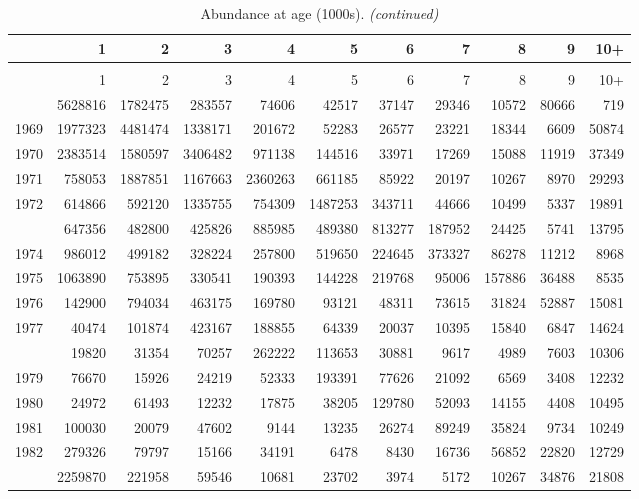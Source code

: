 \documentclass[
]{article}
\begin{document}
\begin{longtable}[t]{lrrrrrrrrrr}
\caption{\label{tab:NAA-table}Abundance at age (1000s).}\\
\toprule
  & 1 & 2 & 3 & 4 & 5 & 6 & 7 & 8 & 9 & 10+\\
\midrule
\endfirsthead
\caption[]{Abundance at age (1000s). \textit{(continued)}}\\
\toprule
  & 1 & 2 & 3 & 4 & 5 & 6 & 7 & 8 & 9 & 10+\\
\midrule
\endhead

\endfoot
\bottomrule
\endlastfoot
1968 & 5628816 & 1782475 & 283557 & 74606 & 42517 & 37147 & 29346 & 10572 & 80666 & 719\\
1969 & 1977323 & 4481474 & 1338171 & 201672 & 52283 & 26577 & 23221 & 18344 & 6609 & 50874\\
1970 & 2383514 & 1580597 & 3406482 & 971138 & 144516 & 33971 & 17269 & 15088 & 11919 & 37349\\
1971 & 758053 & 1887851 & 1167663 & 2360263 & 661185 & 85922 & 20197 & 10267 & 8970 & 29293\\
1972 & 614866 & 592120 & 1335755 & 754309 & 1487253 & 343711 & 44666 & 10499 & 5337 & 19891\\
\addlinespace
1973 & 647356 & 482800 & 425826 & 885985 & 489380 & 813277 & 187952 & 24425 & 5741 & 13795\\
1974 & 986012 & 499182 & 328224 & 257800 & 519650 & 224645 & 373327 & 86278 & 11212 & 8968\\
1975 & 1063890 & 753895 & 330541 & 190393 & 144228 & 219768 & 95006 & 157886 & 36488 & 8535\\
1976 & 142900 & 794034 & 463175 & 169780 & 93121 & 48311 & 73615 & 31824 & 52887 & 15081\\
1977 & 40474 & 101874 & 423167 & 188855 & 64339 & 20037 & 10395 & 15840 & 6847 & 14624\\
\addlinespace
1978 & 19820 & 31354 & 70257 & 262222 & 113653 & 30881 & 9617 & 4989 & 7603 & 10306\\
1979 & 76670 & 15926 & 24219 & 52333 & 193391 & 77626 & 21092 & 6569 & 3408 & 12232\\
1980 & 24972 & 61493 & 12232 & 17875 & 38205 & 129780 & 52093 & 14155 & 4408 & 10495\\
1981 & 100030 & 20079 & 47602 & 9144 & 13235 & 26274 & 89249 & 35824 & 9734 & 10249\\
1982 & 279326 & 79797 & 15166 & 34191 & 6478 & 8430 & 16736 & 56852 & 22820 & 12729\\
\addlinespace
1983 & 2259870 & 221958 & 59546 & 10681 & 23702 & 3974 & 5172 & 10267 & 34876 & 21808\\

\end{longtable}
\end{document}
